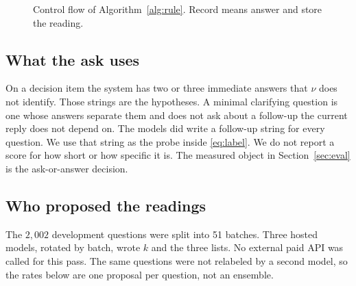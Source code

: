 \documentclass[journal]{IEEEtran}
\begin{document}
\begin{figure}[!t]
\centering
{}
\caption{Control flow of Algorithm~\ref{alg:rule}. Record means answer and store the reading.}
\label{fig:rule}
\end{figure}

\subsection{What the ask uses}
On a decision item the system has two or three immediate answers that $\nu$ does not identify.
Those strings are the hypotheses.
A minimal clarifying question is one whose answers separate them and does not ask about a follow-up the current reply does not depend on.
The models did write a follow-up string for every question.
We use that string as the probe inside \eqref{eq:label}.
We do not report a score for how short or how specific it is.
The measured object in Section~\ref{sec:eval} is the ask-or-answer decision.

\subsection{Who proposed the readings}
The $2{,}002$ development questions were split into 51 batches.
Three hosted models, rotated by batch, wrote $k$ and the three lists.
No external paid API was called for this pass.
The same questions were not relabeled by a second model, so the rates below are one proposal per question, not an ensemble.
\end{document}

